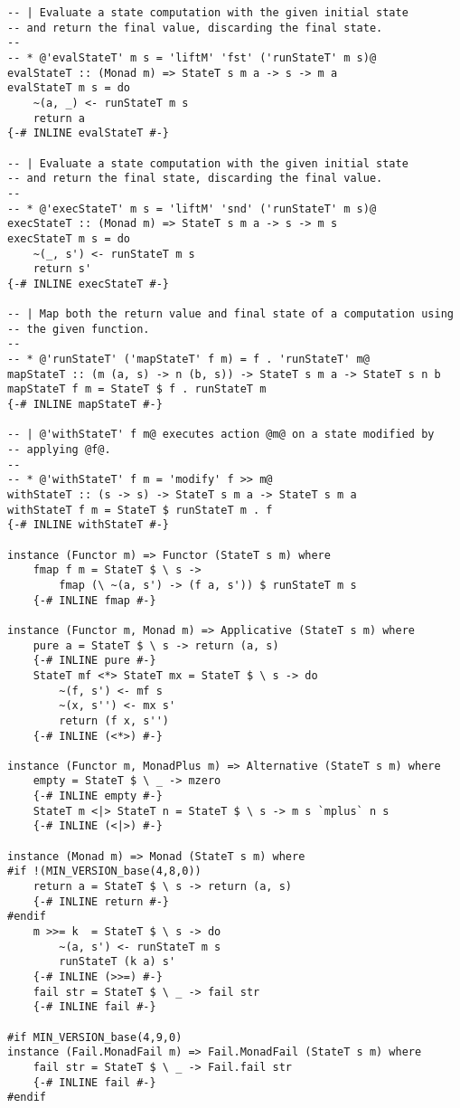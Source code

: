 \begin{lstlisting}
-- | Evaluate a state computation with the given initial state
-- and return the final value, discarding the final state.
--
-- * @'evalStateT' m s = 'liftM' 'fst' ('runStateT' m s)@
evalStateT :: (Monad m) => StateT s m a -> s -> m a
evalStateT m s = do
    ~(a, _) <- runStateT m s
    return a
{-# INLINE evalStateT #-}

-- | Evaluate a state computation with the given initial state
-- and return the final state, discarding the final value.
--
-- * @'execStateT' m s = 'liftM' 'snd' ('runStateT' m s)@
execStateT :: (Monad m) => StateT s m a -> s -> m s
execStateT m s = do
    ~(_, s') <- runStateT m s
    return s'
{-# INLINE execStateT #-}

-- | Map both the return value and final state of a computation using
-- the given function.
--
-- * @'runStateT' ('mapStateT' f m) = f . 'runStateT' m@
mapStateT :: (m (a, s) -> n (b, s)) -> StateT s m a -> StateT s n b
mapStateT f m = StateT $ f . runStateT m
{-# INLINE mapStateT #-}

-- | @'withStateT' f m@ executes action @m@ on a state modified by
-- applying @f@.
--
-- * @'withStateT' f m = 'modify' f >> m@
withStateT :: (s -> s) -> StateT s m a -> StateT s m a
withStateT f m = StateT $ runStateT m . f
{-# INLINE withStateT #-}

instance (Functor m) => Functor (StateT s m) where
    fmap f m = StateT $ \ s ->
        fmap (\ ~(a, s') -> (f a, s')) $ runStateT m s
    {-# INLINE fmap #-}

instance (Functor m, Monad m) => Applicative (StateT s m) where
    pure a = StateT $ \ s -> return (a, s)
    {-# INLINE pure #-}
    StateT mf <*> StateT mx = StateT $ \ s -> do
        ~(f, s') <- mf s
        ~(x, s'') <- mx s'
        return (f x, s'')
    {-# INLINE (<*>) #-}

instance (Functor m, MonadPlus m) => Alternative (StateT s m) where
    empty = StateT $ \ _ -> mzero
    {-# INLINE empty #-}
    StateT m <|> StateT n = StateT $ \ s -> m s `mplus` n s
    {-# INLINE (<|>) #-}

instance (Monad m) => Monad (StateT s m) where
#if !(MIN_VERSION_base(4,8,0))
    return a = StateT $ \ s -> return (a, s)
    {-# INLINE return #-}
#endif
    m >>= k  = StateT $ \ s -> do
        ~(a, s') <- runStateT m s
        runStateT (k a) s'
    {-# INLINE (>>=) #-}
    fail str = StateT $ \ _ -> fail str
    {-# INLINE fail #-}

#if MIN_VERSION_base(4,9,0)
instance (Fail.MonadFail m) => Fail.MonadFail (StateT s m) where
    fail str = StateT $ \ _ -> Fail.fail str
    {-# INLINE fail #-}
#endif


\end{lstlisting}
